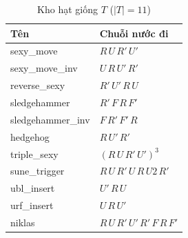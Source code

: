 \documentclass[10pt,conference]{article}
\begin{document}
\begin{table}[h]
\centering
\caption{Kho hạt giống $T$ ($|T|=11$)}
\label{tab:corpus}
\begin{tabular}{ll}
\toprule
Tên & Chuỗi nước đi \\
\midrule
sexy\_move & $R\,U\,R'\,U'$ \\
sexy\_move\_inv & $U\,R\,U'\,R'$ \\
reverse\_sexy & $R'\,U'\,R\,U$ \\
sledgehammer & $R'\,F\,R\,F'$ \\
sledgehammer\_inv & $F\,R'\,F'\,R$ \\
hedgehog & $R\,U'\,R'$ \\
triple\_sexy & $(R\,U\,R'\,U')^3$ \\
sune\_trigger & $R\,U\,R'\,U\,R\,U2\,R'$ \\
ubl\_insert & $U'\,R\,U$ \\
urf\_insert & $U\,R\,U'$ \\
niklas & $R\,U\,R'\,U'\,R'\,F\,R\,F'$ \\
\bottomrule
\end{tabular}
\end{table}
\end{document}
